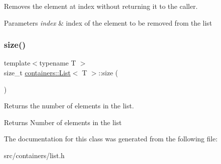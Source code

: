 Removes the element at {\ttfamily index} without returning it to the caller.


\begin{DoxyParams}{Parameters}
{\em index} & index of the element to be removed from the list \\
\hline
\end{DoxyParams}
\mbox{\label{classcontainers_1_1_list_a9b1cb61c1a73150a8da3eb576eeb812a}} 
\subsubsection{\texorpdfstring{size()}{size()}}
{\footnotesize\ttfamily template$<$typename T $>$ \\
size\+\_\+t \hyperlink{classcontainers_1_1_list}{containers\+::\+List}$<$ T $>$\+::size (\begin{DoxyParamCaption}{ }\end{DoxyParamCaption})\hspace{0.3cm}{\ttfamily [inline]}}

Returns the number of elements in the list.

\begin{DoxyReturn}{Returns}
Number of elements in the list 
\end{DoxyReturn}


The documentation for this class was generated from the following file\+:\begin{DoxyCompactItemize}
\item 
src/containers/list.\+h\end{DoxyCompactItemize}
